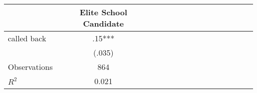 \begin{tabular}{l*{14}{c}}
                    &\multicolumn{1}{c}{Elite School Candidate}\\
\hline
called back         &         .15***\\
                    &      (.035)   \\
\hline
Observations        &         864   \\
\(R^{2}\)           &       0.021   \\
\end{tabular}
